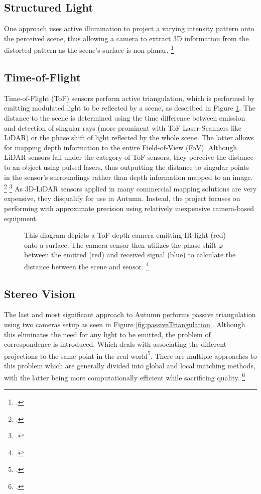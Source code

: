 \subsection{Structured Light}
One approach uses active illumination to project a varying intensity pattern onto the perceived scene, thus allowing a camera to extract 3D information from the distorted pattern as the scene's surface is non-planar. \footcite{geng2011StructuredLight}

\subsection{Time-of-Flight}
Time-of-Flight (ToF) sensors perform active triangulation, which is performed by emitting modulated light to be reflected by a scene, as described in Figure \ref{fig:activeTriangulation}. The distance to the scene is determined using the time difference between emission and detection of singular rays (more prominent with ToF Laser-Scanners like LiDAR) or the phase shift of light reflected by the whole scene. The latter allows for mapping depth information to the entire Field-of-View (FoV). 
Although LiDAR sensors fall under the category of ToF sensors, they perceive the distance to an object using pulsed lasers, thus outputting
the distance to singular points in the sensor's surroundings rather than depth information mapped to an image. \footcite{gokturk2004time} \footcite{velodyne2021LiDAR}
As 3D-LiDAR sensors applied in many commercial mapping solutions are very expensive, they disqualify for use in Autumn. Instead, the project focuses on performing with approximate precision using relatively inexpensive camera-based equipment. 

\begin{figure}
	\centering
	
	\caption{
		This diagram depicts a ToF depth camera emitting IR-light (red) onto a surface. The camera sensor then utilizes the phase-shift $\varphi$ between the emitted (red) and received signal (blue) to calculate the distance between the scene and sensor. \footcite{altuntas2021triangulation}
	}
	\label{fig:activeTriangulation}
\end{figure}


\subsection{Stereo Vision}
The last and most significant approach to Autumn performs passive triangulation using two cameras setup as seen in Figure \ref{fig:passiveTriangulation}. Although this eliminates the need for any light to be emitted, the problem of correspondence is introduced. Which deals with associating the different projections to the same point in the real world\footcite{ng2019StereoCorrespondence}. There are multiple approaches to this problem which are generally divided into global and local matching methods, with the latter being more computationally efficient while sacrificing quality. \footcite{do2019review}

